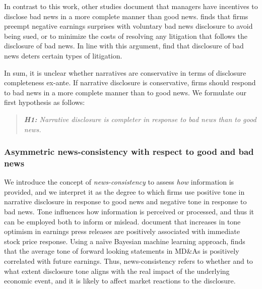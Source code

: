 \documentclass[letterpaper,12pt]{article}
\begin{document}
\begin{spacing}{1.5}
In contrast to this work, other studies document that managers have incentives to disclose bad news in a more complete manner than good news.  finds that firms preempt negative earnings surprises with voluntary bad news disclosure to avoid being sued, or to minimize the costs of resolving any litigation that follows the disclosure of bad news. In line with this argument,  find that disclosure of bad news deters certain types of litigation. 

In sum, it is unclear whether narratives are conservative in terms of disclosure completeness ex-ante. If narrative disclosure is conservative, firms should respond to bad news in a more complete manner than to good news. We formulate our first hypothesis as follows:

\begin{quote}\label{hyp:h1}
\textit{\textbf{H1:} Narrative disclosure is completer in response to bad news than to good news.}
\end{quote}

\subsubsection{Asymmetric news-consistency with respect to good and bad news}

\noindent We introduce the concept of \textit{news-consistency} to assess \textit{how} information is provided, and we interpret it as the degree to which firms use positive tone in narrative disclosure in response to good news and negative tone in response to bad news. %
Tone influences how information is perceived or processed, and thus it can be employed both to inform or mislead.  document that increases in tone optimism in earnings press releases are positively associated with immediate stock price response. Using a naïve Bayesian machine learning approach,  finds that the average tone of forward looking statements in MD\&As is positively correlated with future earnings. Thus, news-consistency refers to whether and to what extent disclosure tone aligns with the real impact of the underlying economic event, and it is likely to affect market reactions to the disclosure. 



\end{spacing}
\end{document}
